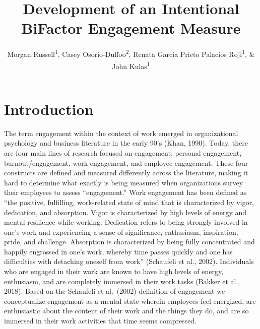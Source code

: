 \documentclass[
  english,
  man]{apa7}
\title{Development of an Intentional BiFactor Engagement Measure}
\author{Morgan Russell\textsuperscript{1}, Casey Osorio-Duffoo\textsuperscript{2}, Renata Garcia Prieto Palacios Roji\textsuperscript{1}, \& John Kulas\textsuperscript{1}}
\date{}
\affiliation{\vspace{0.5cm}\textsuperscript{1} Montclair State University\\\textsuperscript{2} Harver}
\begin{document}
\maketitle

\hypertarget{introduction}{%
\section{Introduction}\label{introduction}}

The term engagement within the context of work emerged in organizational psychology and business literature in the early 90's (Khan, 1990). Today, there are four main lines of research focused on engagement: personal engagement, burnout/engagement, work engagement, and employee engagement. These four constructs are defined and measured differently across the literature, making it hard to determine what exactly is being measured when organizations survey their employees to assess ``engagement.'' Work engagement has been defined as ``the positive, fulfilling, work-related state of mind that is characterized by vigor, dedication, and absorption. Vigor is characterized by high levels of energy and mental resilience while working. Dedication refers to being strongly involved in one's work and experiencing a sense of significance, enthusiasm, inspiration, pride, and challenge. Absorption is characterized by being fully concentrated and happily engrossed in one's work, whereby time passes quickly and one has difficulties with detaching oneself from work'' (Schaufeli et al., 2002). Individuals who are engaged in their work are known to have high levels of energy, enthusiasm, and are completely immersed in their work tasks (Bakker et al., 2018). Based on the Schaufeli et al.~(2002) definition of engagement we conceptualize engagement as a mental state wherein employees feel energized, are enthusiastic about the content of their work and the things they do, and are so immersed in their work activities that time seems compressed.
\end{document}
